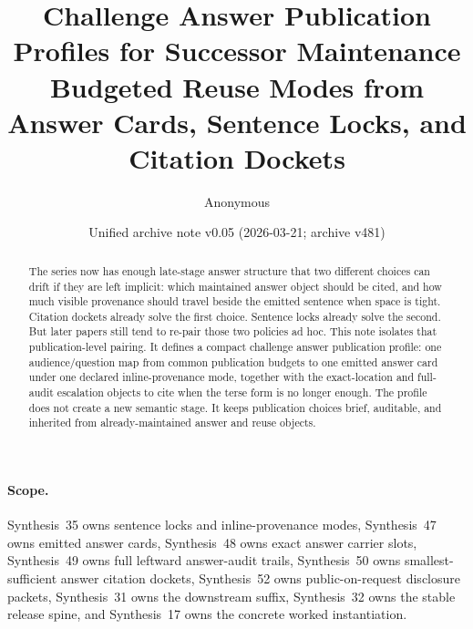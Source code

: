 \documentclass[11pt]{article}
\title{Challenge Answer Publication Profiles for Successor Maintenance\\\large Budgeted Reuse Modes from Answer Cards, Sentence Locks, and Citation Dockets}
\author{Anonymous}
\date{Unified archive note v0.05 (2026-03-21; archive v481)}
\begin{document}
\maketitle

\begin{abstract}
The series now has enough late-stage answer structure that two different choices can drift if they are left implicit: which maintained answer object should be cited, and how much visible provenance should travel beside the emitted sentence when space is tight. Citation dockets already solve the first choice. Sentence locks already solve the second. But later papers still tend to re-pair those two policies ad hoc. This note isolates that publication-level pairing. It defines a compact challenge answer publication profile: one audience/question map from common publication budgets to one emitted answer card under one declared inline-provenance mode, together with the exact-location and full-audit escalation objects to cite when the terse form is no longer enough. The profile does not create a new semantic stage. It keeps publication choices brief, auditable, and inherited from already-maintained answer and reuse objects.
\end{abstract}

\paragraph{Scope.}
Synthesis~35 owns sentence locks and inline-provenance modes, Synthesis~47 owns emitted answer cards, Synthesis~48 owns exact answer carrier slots, Synthesis~49 owns full leftward answer-audit trails, Synthesis~50 owns smallest-sufficient answer citation dockets, Synthesis~52 owns public-on-request disclosure packets, Synthesis~31 owns the downstream suffix, Synthesis~32 owns the stable release spine, and Synthesis~17 owns the concrete worked instantiation.\cite{series:sentencelocks,series:challengeanswercards,series:challengeanswercarrierslots,series:challengeansweraudittrails,series:challengeanswercitationdockets,series:challengeanswerdisclosurepackets,series:downstreamnormalforms,series:releasespine,series:workedexample}
\end{document}
